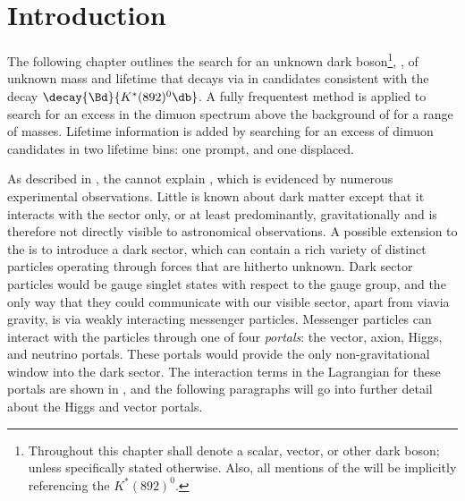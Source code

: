 \section{Introduction}
\label{sec:db:intro}


The following chapter outlines the search for an unknown dark boson\footnote{
  Throughout this chapter \db shall denote a scalar, vector, or
  other dark boson; unless specifically stated otherwise.
  Also, all mentions of the \Kstarz will be implicitly referencing the $K^*(892)^0$.
}, \db, of unknown mass and lifetime that decays via \dbtomumu in candidates consistent with the
decay $\decay{\Bd}{K^*(892)^0\db}$.
A fully frequentest method is applied to search for an excess in the dimuon spectrum above the \sm
background of \btokstrmumu for a range of masses.
Lifetime information is added by searching for an excess of dimuon candidates in two lifetime bins:
one prompt, and one displaced.


As described in , the \sm cannot explain \dm, which is evidenced by
numerous experimental observations.
Little is known about dark matter except that it interacts with the \sm sector only, or at least
predominantly, gravitationally and is therefore not directly visible to astronomical observations.
A possible extension to the \sm is to introduce a dark sector, which can contain a rich variety of
distinct particles operating through forces that are hitherto unknown.
Dark sector particles would be gauge singlet states with respect to the \sm gauge group, and
the only way that they could communicate with our visible sector, apart from viavia  gravity,
is via weakly interacting messenger particles.
Messenger particles can interact with the \sm particles through one of four \emph{portals}:
the vector, axion, Higgs, and neutrino portals.
These portals would provide the only non-gravitational window into the dark sector.
The interaction terms in the Lagrangian for these portals are shown in , and
the following paragraphs will go into further detail about the Higgs and vector portals.

